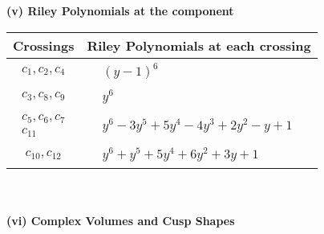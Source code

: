 \documentclass[1p]{elsarticle_modified}
\theoremstyle{definition}
\begin{document}
\newpage\renewcommand{\arraystretch}{1}
\flushleft \textbf{(v) Riley Polynomials at the component}\newline \\
\begin{tabular}{m{50pt}|m{274pt}}
Crossings & \hspace{64pt}Riley Polynomials at each crossing \\
\hline $$\begin{aligned}c_{1},c_{2},c_{4}\end{aligned}$$&$\begin{aligned}
&(y-1)^6
\end{aligned}$\\
\hline $$\begin{aligned}c_{3},c_{8},c_{9}\end{aligned}$$&$\begin{aligned}
&y^6
\end{aligned}$\\
\hline $$\begin{aligned}c_{5},c_{6},c_{7}\\c_{11}\end{aligned}$$&$\begin{aligned}
&y^6-3 y^5+5 y^4-4 y^3+2 y^2- y+1
\end{aligned}$\\
\hline $$\begin{aligned}c_{10},c_{12}\end{aligned}$$&$\begin{aligned}
&y^6+y^5+5 y^4+6 y^2+3 y+1
\end{aligned}$\\
\hline
\end{tabular}\\~\\
\newpage\flushleft \textbf{(vi) Complex Volumes and Cusp Shapes}
\end{document}
